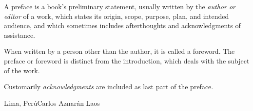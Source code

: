 \preface

A preface is a book's preliminary statement, usually written by the \textit{author or editor} of a work, which states its origin, scope, purpose, plan, and intended audience, and which sometimes includes afterthoughts and acknowledgments of assistance.

When written by a person other than the author, it is called a foreword.
The preface or foreword is distinct from the introduction, which deals with the subject of the work.

Customarily \textit{acknowledgments} are included as last part of the preface.

\vspace{\baselineskip}
\begin{flushright}\noindent
    Lima, Perú\hfill Carlos Aznarán Laos
\end{flushright}


